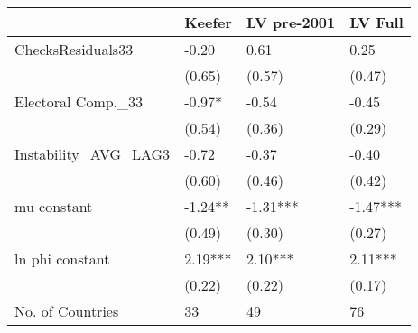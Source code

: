 {\scriptsize
\begin{tabular}{llll}
  \hline
 & Keefer & LV pre-2001 & LV Full \\ 
  \hline
ChecksResiduals33 & -0.20 & 0.61 & 0.25 \\ 
   & (0.65) & (0.57) & (0.47) \\ 
  Electoral Comp.\_33 & -0.97* & -0.54 & -0.45 \\ 
   & (0.54) & (0.36) & (0.29) \\ 
  Instability\_AVG\_LAG3 & -0.72 & -0.37 & -0.40 \\ 
   & (0.60) & (0.46) & (0.42) \\ 
  mu constant & -1.24** & -1.31*** & -1.47*** \\ 
   & (0.49) & (0.30) & (0.27) \\ 
  ln phi constant & 2.19*** & 2.10*** & 2.11*** \\ 
   & (0.22) & (0.22) & (0.17) \\ 
  No. of Countries & 33 & 49 & 76 \\ 
   \hline
\end{tabular}
}
